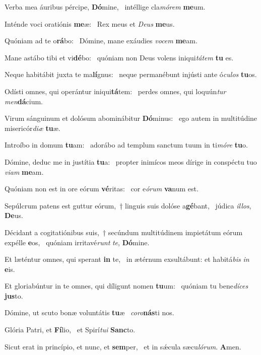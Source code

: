 \item Verba mea áuribus pércipe, \textbf{Dó}mine,~\psstar{} intéllige cla\textit{mórem} \textbf{me}um.
\item Inténde voci oratiónis \textbf{me}æ:~\psstar{} Rex meus et \textit{Deus} \textbf{me}us.
\item Quóniam ad te o\textbf{rá}bo:~\psstar{} Dómine, mane exáudies \textit{vocem} \textbf{me}am.
\item Mane astábo tibi et vi\textbf{dé}bo:~\psstar{} quóniam non Deus volens iniqui\textit{tátem} \textbf{tu} es.
\item Neque habitábit juxta te ma\textbf{lí}gnus:~\psstar{} neque permanébunt injústi ante ó\textit{culos} \textbf{tu}os.
\item Odísti omnes, qui operántur iniqui\textbf{tá}tem:~\psstar{} perdes omnes, qui loquún\textit{tur} \textit{men}\textbf{dá}cium.
\item Virum sánguinum et dolósum abominábitur \textbf{Dó}minus:~\psstar{} ego autem in multitúdine misericór\textit{diæ} \textbf{tu}æ.
\item Introíbo in domum \textbf{tu}am:~\psstar{} adorábo ad templum sanctum tuum in ti\textit{móre} \textbf{tu}o.
\item Dómine, deduc me in justítia \textbf{tu}a:~\psstar{} propter inimícos meos dírige in conspéctu tuo \textit{viam} \textbf{me}am.
\item Quóniam non est in ore eórum \textbf{vé}ritas:~\psstar{} cor e\textit{órum} \textbf{va}num est.
\item Sepúlcrum patens est guttur eórum,~† linguis suis dolóse a\textbf{gé}bant,~\psstar{} júdica \textit{illos}, \textbf{De}us.
\item Décidant a cogitatiónibus suis,~† secúndum multitúdinem impietátum eórum expélle \textbf{e}os,~\psstar{} quóniam irritavé\textit{runt} \textit{te}, \textbf{Dó}mine.
\item Et læténtur omnes, qui sperant \textbf{in} te,~\psstar{} in ætérnum exsultábunt: et habitá\textit{bis} \textit{in} \textbf{e}is.
\item Et gloriabúntur in te omnes, qui díligunt nomen \textbf{tu}um:~\psstar{} quóniam tu bene\textit{díces} \textbf{jus}to.
\item Dómine, ut scuto bonæ voluntátis \textbf{tu}æ~\psstar{} \textit{coro}\textbf{nás}ti nos.
\item Glória Patri, et \textbf{Fí}lio,~\psstar{} et Spirí\textit{tui} \textbf{Sanc}to.
\item Sicut erat in princípio, et nunc, et \textbf{sem}per,~\psstar{} et in sǽcula sæcu\textit{lórum}. \textbf{A}men.
